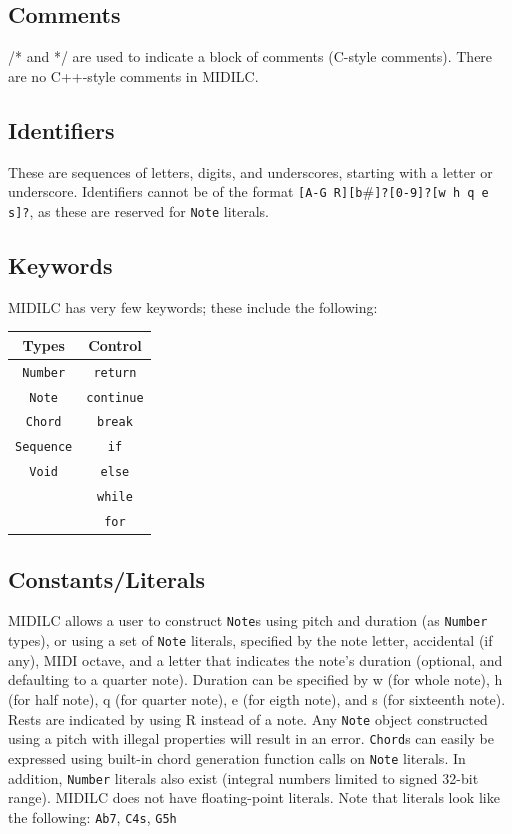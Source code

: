 \documentclass[12pt,A4]{book}
\begin{document}
\subsection{Comments}
/* and */ are used to indicate a block of comments (C-style comments).  There are no C++-style comments in MIDILC.
\subsection{Identifiers}
These are sequences of letters, digits, and underscores, starting with a letter or underscore.  Identifiers cannot be of the format \verb|[A-G R][b|\#\verb|]?[0-9]?[w h q e s]?|, as these are reserved for \verb|Note| literals.
\subsection{Keywords}
MIDILC has very few keywords; these include the following:

\begin{tabular}{|c|c|}
\hline
Types & Control \\ \hline
\verb|Number| & \verb|return| \\ \hline
\verb|Note|	& \verb|continue| \\ \hline
\verb|Chord| & \verb|break| \\ \hline
\verb|Sequence|	& \verb|if| \\ \hline
\verb|Void|	& \verb|else| \\ \hline
	& \verb|while| \\ \hline
	& \verb|for| \\ \hline
\end{tabular}


\subsection{Constants/Literals}
MIDILC allows a user to construct \verb|Note|s using pitch and duration (as \verb|Number| types), or using a set of \verb|Note| literals, specified by the note letter, accidental (if any), MIDI octave, and a letter that indicates the note’s duration (optional, and defaulting to a quarter note).  Duration can be specified by w (for whole note), h (for half note), q (for quarter note), e (for eigth note), and s (for sixteenth note).  Rests are indicated by using R instead of a note. Any \verb|Note| object constructed using a pitch with illegal properties will result in an error. \verb|Chord|s can easily be expressed using built-in chord generation function calls on \verb|Note| literals.  In addition, \verb|Number| literals also exist (integral numbers limited to signed 32-bit range).  MIDILC does not have floating-point literals.
Note that literals look like the following:
\verb|Ab7|,
\verb|C4s|,
\verb|G5h|
\end{document}
